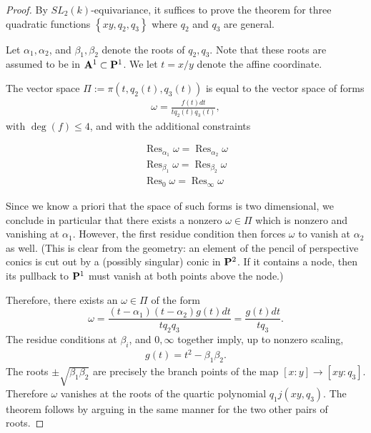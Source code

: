 \documentclass[11pt,reqno]{amsart}
\theoremstyle{plain}
\theoremstyle{definition}
\theoremstyle{remark}
\numberwithin{equation}{section}
\DeclareMathOperator{\res}{Res}
\renewcommand{\to}{{\longrightarrow}}
\numberwithin{equation}{section}
\begin{document}
\begin{proof}
  By $SL_2(k)$-equivariance, it suffices to prove the theorem for three quadratic functions $\left\{ xy, q_{2}, q_{3} \right\}$ where $q_{2}$ and $q_{3}$ are general.
 
  Let $\alpha_{1}, \alpha_{2}$, and $\beta_{1}, \beta_{2}$ denote the roots of $q_{2}, q_{3}$. Note that these roots are assumed to be in ${\bf A}^{1} \subset \P^{1}$.  We let $t = x/y$ denote the affine coordinate.

  The vector space $\Pi := \pi(t, q_{2}(t), q_{3}(t))$ is equal to the vector space of forms
  \begin{align*}
    \omega = \frac{f(t)dt}{tq_{2}(t)q_{3}(t)},
  \end{align*}
  with $\deg(f) \leq 4$, and with the additional constraints

 \begin{align*}
    \res_{\alpha_{1}}\omega = \res_{ \alpha_{2}} \omega\\
    \res_{\beta_{1}}\omega = \res_{ \beta_{2}} \omega\\
    \res_{0}\omega = \res_{\infty} \omega
  \end{align*}

  Since we know a priori that the space of such forms is two dimensional, we conclude in particular that there exists a nonzero $\omega \in \Pi$ which is nonzero and vanishing at $\alpha_{1}$.  However, the first residue condition then forces $\omega$ to vanish at $\alpha_{2}$ as well. (This is clear from the geometry: an element of the pencil of perspective conics is cut out by a (possibly singular) conic in $\P^{2}$. If it contains a node, then its pullback to $\P^1$ must vanish at both points above the node.)

  Therefore, there exists an $\omega \in \Pi$ of the form $$ \omega = \frac{(t-\alpha_{1})(t-\alpha_{2})g(t)dt}{tq_{2}q_{3}} = \frac{g(t)dt}{tq_{3}}.$$
  The residue conditions at $\beta_{i}$, and $0, \infty$ together imply, up to nonzero scaling,
  \begin{align*}
    g(t) = t^{2} - \beta_{1}\beta_{2}.
  \end{align*}
  The roots $\pm \sqrt{\beta_{1}\beta_{2}}$ are precisely the branch points of the map $[x:y] \to [xy : q_{3}]$.  Therefore $\omega$ vanishes at the roots of the quartic polynomial $q_{1}j(xy,q_{3})$. The theorem follows by arguing in the same manner for the two other pairs of roots.

\end{proof}
\end{document}

